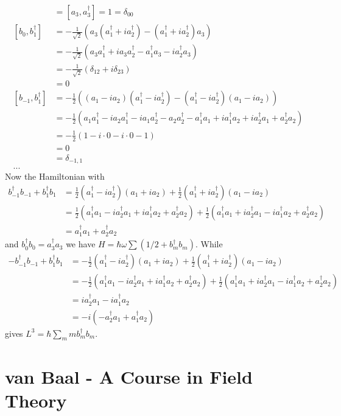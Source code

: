 \documentclass[10pt,a4paper]{book}
\theoremstyle{definition}
\begin{document}
\begin{align}
[b_0,b_0^\dagger]&=[a_3,a_3^\dagger]=1=\delta_{00}\\
[b_0,b_1^\dagger]
&=-\frac{1}{\sqrt{2}}(a_3(a_1^\dagger+ia_2^\dagger)-(a_1^\dagger+ia_2^\dagger)a_3 )\\
&=-\frac{1}{\sqrt{2}}(a_3a_1^\dagger+ia_3a_2^\dagger-a_1^\dagger a_3-ia_2^\dagger a_3 )\\
&=-\frac{1}{\sqrt{2}}(\delta_{12}+i\delta_{23} )\\
&=0\\
[b_{-1},b_1^\dagger]&=-\frac{1}{2}((a_1-ia_2)(a_1^\dagger-ia_2^\dagger) - (a_1^\dagger-ia_2^\dagger)(a_1-ia_2) )\\
&=-\frac{1}{2}(a_1a_1^\dagger-ia_2a_1^\dagger-ia_1a_2^\dagger-a_2a_2^\dagger-a_1^\dagger a_1+ia_1^\dagger a_2+ia_2^\dagger a_1+a_2^\dagger a_2)\\
&=-\frac{1}{2}(1-i\cdot 0-i\cdot 0-1)\\
&=0\\
&=\delta_{-1,1}\\
...
\end{align}
Now the Hamiltonian with
\begin{align}
b_{-1}^\dagger b_{-1}+b_{1}^\dagger b_{1}
&=\frac{1}{2}(a_1^\dagger-ia_2^\dagger)(a_1+ia_2)+\frac{1}{2}(a_1^\dagger+ia_2^\dagger)(a_1-ia_2)\\
&=\frac{1}{2}(a_1^\dagger a_1-ia_2^\dagger a_1+ia_1^\dagger a_2+a_2^\dagger a_2)+\frac{1}{2}(a_1^\dagger a_1+ia_2^\dagger a_1-ia_1^\dagger a_2+a_2^\dagger a_2)\\
&=a_1^\dagger a_1+a_2^\dagger a_2
\end{align}
and $b_0^\dagger b_0=a_3^\dagger a_3$ we have $H=\hbar\omega\sum(1/2+b_m^\dagger b_m)$. While
\begin{align}
-b_{-1}^\dagger b_{-1}+b_{1}^\dagger b_{1}
&=-\frac{1}{2}(a_1^\dagger-ia_2^\dagger)(a_1+ia_2)+\frac{1}{2}(a_1^\dagger+ia_2^\dagger)(a_1-ia_2)\\
&=-\frac{1}{2}(a_1^\dagger a_1-ia_2^\dagger a_1+ia_1^\dagger a_2+a_2^\dagger a_2)+\frac{1}{2}(a_1^\dagger a_1+ia_2^\dagger a_1-ia_1^\dagger a_2+a_2^\dagger a_2)\\
&=ia_2^\dagger a_1-ia_1^\dagger a_2\\
&=-i(-a_2^\dagger a_1+a_1^\dagger a_2)
\end{align}
gives $L^3=\hbar\sum_m mb_m^\dagger b_m$.



\section{{\sc van Baal} - A Course in Field Theory}
\end{document}

